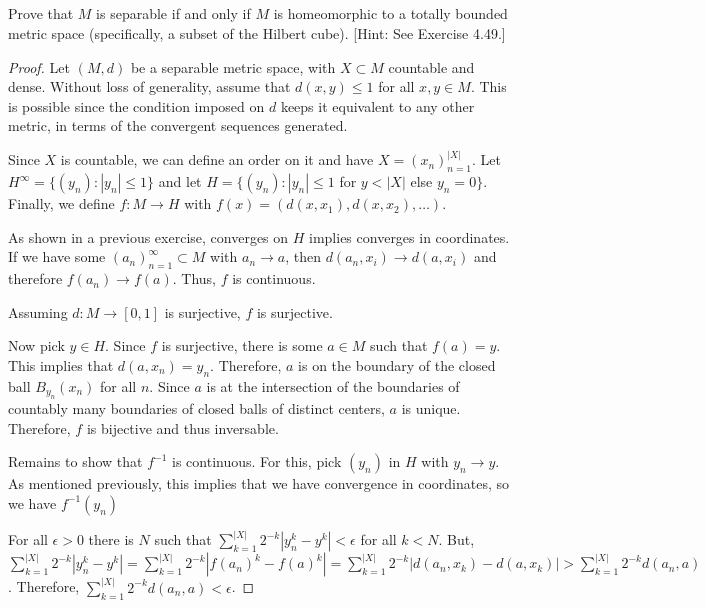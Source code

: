 
\subsection{} Prove that $M$ is separable if and only if $M$ is homeomorphic to a totally bounded metric space (specifically, a subset of the Hilbert cube). [Hint: See Exercise 4.49.]

\begin{proof}

Let $(M,d)$ be a separable metric space, with $X \subset M$ countable and dense. Without loss of generality, assume that $d(x,y) \leq 1$ for all $x,y \in M$. This is possible since the condition imposed on $d$ keeps it equivalent to any other metric, in terms of the convergent sequences generated.

Since $X$ is countable, we can define an order on it and have $X = (x_n)_{n=1}^{|X|}$.
Let $H^\infty = \{(y_n): |y_n| \leq 1\}$ and let $H = \{(y_n): |y_n| \leq 1 $ for $y < |X|$ else $y_n = 0\}$. Finally, we define $f: M \rightarrow H$ with $f(x) = (d(x,x_1), d(x,x_2), \dots)$. 

As shown in a previous exercise, converges on $H$ implies converges in coordinates. If we have some $(a_n)_{n=1}^\infty \subset M$ with $a_n \rightarrow a$, then $d(a_n, x_i) \rightarrow d(a, x_i)$ and therefore $f(a_n) \rightarrow f(a)$. Thus, $f$ is continuous.

Assuming $d:M \rightarrow [0,1]$ is surjective, $f$ is surjective.

Now pick $y \in H$. Since $f$ is surjective, there is some $a \in M$ such that $f(a) = y$. This implies that $d(a,x_n) = y_n$. Therefore, $a$ is on the boundary of the closed ball $B_{y_n}(x_n)$ for all $n$. Since $a$ is at the intersection of the boundaries of countably many boundaries of closed balls of distinct centers, $a$ is unique. Therefore, $f$ is bijective and thus inversable. 


Remains to show that $f^{-1}$ is continuous. For this, pick $(y_n)$ in $H$ with $y_n \rightarrow y$. As mentioned previously, this implies that we have convergence in coordinates, so we have $f^{-1}(y_n)$

For all $\epsilon > 0$ there is $N$ such that $\sum_{k=1}^{|X|} 2^{-k} |y_n^k - y^k| < \epsilon$ for all $k < N$. But, $\sum_{k=1}^{|X|} 2^{-k} |y_n^k - y^k| =  \sum_{k=1}^{|X|} 2^{-k} |f(a_n)^k - f(a)^k| =  \sum_{k=1}^{|X|} 2^{-k} |d(a_n, x_k) - d(a, x_k)| > \sum_{k=1}^{|X|} 2^{-k} d(a_n, a)$. Therefore, $\sum_{k=1}^{|X|} 2^{-k} d(a_n, a) < \epsilon$.


\end{proof}
